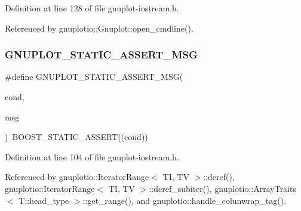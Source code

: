 Definition at line 128 of file gnuplot-\/iostream.\+h.



Referenced by gnuplotio\+::\+Gnuplot\+::open\+\_\+cmdline().

\mbox{\label{gnuplot-iostream_8h_a763d85d6a998475c41e5bea11e6f0a16}} 
\subsubsection{\texorpdfstring{G\+N\+U\+P\+L\+O\+T\+\_\+\+S\+T\+A\+T\+I\+C\+\_\+\+A\+S\+S\+E\+R\+T\+\_\+\+M\+SG}{GNUPLOT\_STATIC\_ASSERT\_MSG}}
{\footnotesize\ttfamily \#define G\+N\+U\+P\+L\+O\+T\+\_\+\+S\+T\+A\+T\+I\+C\+\_\+\+A\+S\+S\+E\+R\+T\+\_\+\+M\+SG(\begin{DoxyParamCaption}\item[{}]{cond,  }\item[{}]{msg }\end{DoxyParamCaption})~B\+O\+O\+S\+T\+\_\+\+S\+T\+A\+T\+I\+C\+\_\+\+A\+S\+S\+E\+RT((cond))}



Definition at line 104 of file gnuplot-\/iostream.\+h.



Referenced by gnuplotio\+::\+Iterator\+Range$<$ T\+I, T\+V $>$\+::deref(), gnuplotio\+::\+Iterator\+Range$<$ T\+I, T\+V $>$\+::deref\+\_\+subiter(), gnuplotio\+::\+Array\+Traits$<$ T\+::head\+\_\+type $>$\+::get\+\_\+range(), and gnuplotio\+::handle\+\_\+colunwrap\+\_\+tag().

